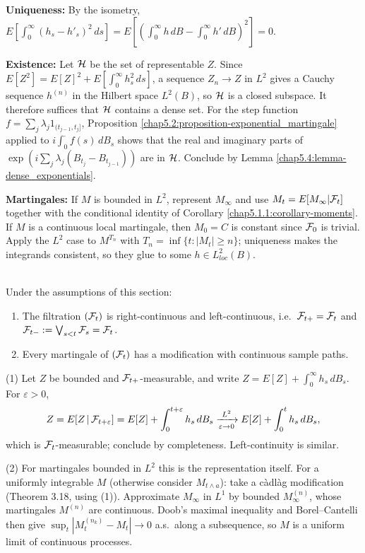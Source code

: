 \begin{proofidea}
\textbf{Uniqueness:} By the isometry, $E[\int_0^\infty(h_s-h'_s)^2\,ds]=E[(\int_0^\infty h\,dB-\int_0^\infty h'\,dB)^2]=0$.

\textbf{Existence:} Let $\mathcal{H}$ be the set of representable $Z$. Since $E[Z^2]=E[Z]^2+E[\int_0^\infty h_s^2\,ds]$, a sequence $Z_n\to Z$ in $L^2$ gives a Cauchy sequence $h^{(n)}$ in the Hilbert space $L^2(B)$, so $\mathcal{H}$ is a closed subspace. It therefore suffices that $\mathcal{H}$ contains a dense set. For the step function $f=\sum_j\lambda_j1_{(t_{j-1},t_j]}$, Proposition \ref{chap5.2:proposition-exponential_martingale} applied to $i\int_0^\cdot f(s)\,dB_s$ shows that the real and imaginary parts of $\exp(i\sum_j\lambda_j(B_{t_j}-B_{t_{j-1}}))$ are in $\mathcal{H}$. Conclude by Lemma \ref{chap5.4:lemma-dense_exponentials}.

\textbf{Martingales:} If $M$ is bounded in $L^2$, represent $M_\infty$ and use $M_t=E[M_\infty|\mathcal{F}_t]$ together with the conditional identity of Corollary \ref{chap5.1.1:corollary-moments}. If $M$ is a continuous local martingale, then $M_0=C$ is constant since $\mathcal{F}_0$ is trivial. Apply the $L^2$ case to $M^{T_n}$ with $T_n=\inf\{t:|M_t|\geq n\}$; uniqueness makes the integrands consistent, so they glue to some $h\in L^2_{loc}(B)$.
\end{proofidea}

\begin{proposition}\label{chap5.4:proposition-consequences}
\\
Under the assumptions of this section:
\begin{enumerate}
    \item The filtration $(\mathcal{F}_t)$ is right-continuous and left-continuous, i.e.\ $\mathcal{F}_{t+}=\mathcal{F}_t$ and $\mathcal{F}_{t-}:=\bigvee_{s<t}\mathcal{F}_s=\mathcal{F}_t$.
    \item Every martingale of $(\mathcal{F}_t)$ has a modification with continuous sample paths.
\end{enumerate}
\end{proposition}

\begin{proofidea}
(1) Let $Z$ be bounded and $\mathcal{F}_{t+}$-measurable, and write $Z=E[Z]+\int_0^\infty h_s\,dB_s$. For $\varepsilon>0$,
$$Z=E[Z\,|\,\mathcal{F}_{t+\varepsilon}]=E[Z]+\int_0^{t+\varepsilon}h_s\,dB_s\xrightarrow[\varepsilon\to0]{L^2}E[Z]+\int_0^th_s\,dB_s,$$
which is $\mathcal{F}_t$-measurable; conclude by completeness. Left-continuity is similar.

(2) For martingales bounded in $L^2$ this is the representation itself. For a uniformly integrable $M$ (otherwise consider $M_{t\wedge a}$): take a càdlàg modification (Theorem 3.18, using (1)). Approximate $M_\infty$ in $L^1$ by bounded $M^{(n)}_\infty$, whose martingales $M^{(n)}$ are continuous. Doob's maximal inequality and Borel--Cantelli then give $\sup_t|M^{(n_k)}_t-M_t|\to0$ a.s.\ along a subsequence, so $M$ is a uniform limit of continuous processes.
\end{proofidea}


